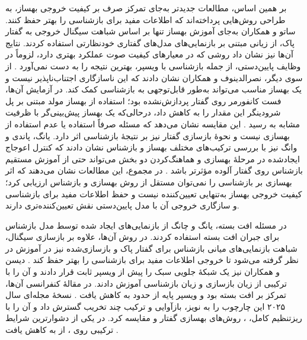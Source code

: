 بر همین اساس، مطالعات جدیدتر به‌جای تمرکز صرف بر کیفیت خروجی بهساز، به طراحی روش‌هایی پرداخته‌اند که اطلاعات مفید برای بازشناسی را بهتر حفظ کنند. ساتو و همکاران به‌جای آموزش بهساز تنها بر اساس شباهت سیگنال خروجی به گفتار پاک، از زیانی مبتنی بر بازنمایی‌های مدل‌های گفتاری خودنظارتی استفاده کردند. نتایج آن‌ها نیز نشان داد روشی که در معیارهای کیفیت صوت عملکرد بهتری دارد، لزوماً در وظایف پایین‌دستی، از جمله بازشناسی با ویسپر، بهترین نتیجه را به دست نمی‌آورد . از سوی دیگر، نصرالدینوف و همکاران نشان دادند که این ناسازگاری اجتناب‌ناپذیر نیست و یک بهساز مناسب می‌تواند به‌طور قابل‌توجهی به بازشناسی کمک کند. در آزمایش آن‌ها،  فست کانفورمر روی گفتار پردازش‌نشده  بود؛ استفاده از بهساز مولد مبتنی بر پل شرودینگر این مقدار را به  کاهش داد، درحالی‌که یک بهساز پیش‌بینی‌گر با ظرفیت مشابه به  رسید . این مقایسه نشان می‌دهد که مسئله صرفاً استفاده یا عدم استفاده از بهسازی نیست و نحوهٔ بازسازی گفتار نیز بر نتیجهٔ بازشناسی اثر دارد. یانگ، پاندی و وانگ نیز با بررسی ترکیب‌های مختلف بهساز و بازشناس نشان دادند که کنترل اعوجاج ایجادشده در مرحلهٔ بهسازی و هماهنگ‌کردن دو بخش می‌تواند حتی از آموزش مستقیم بازشناس روی گفتار آلوده مؤثرتر باشد . در مجموع، این مطالعات نشان می‌دهند که اثر بهسازی بر بازشناسی را نمی‌توان مستقل از روش بهسازی و بازشناس ارزیابی کرد؛ کیفیت خروجی بهساز به‌تنهایی تعیین‌کننده نیست و حفظ اطلاعات مفید برای بازشناسی و سازگاری خروجی آن با مدل پایین‌دستی نقش تعیین‌کننده‌تری دارند.


در مسئله افت بسته، یانگ و چانگ از بازنمایی‌های ایجاد شده توسط مدل بازشناس برای جبران افت بسته استفاده کردند. در روش آن‌ها، علاوه بر بازسازی سیگنال، شباهت بازنمایی‌های میانی بازشناس برای گفتار پاک و بازسازی‌شده نیز در آموزش در نظر گرفته می‌شود تا خروجی  اطلاعات مفید برای بازشناسی را بهتر حفظ کند . دیسن و همکاران نیز یک شبکهٔ جلویی سبک را پیش از ویسپر ثابت قرار دادند و آن را با ترکیبی از زیان بازسازی و زیان بازشناسی آموزش دادند. در مقالهٔ کنفرانسی آن‌ها، تمرکز بر افت بسته بود و  ویسپر پایه از حدود  به  کاهش یافت . نسخهٔ مجله‌ای سال ۲۰۲۵ این چارچوب را به نویز، بازآوایی و ترکیب چند تخریب گسترش داد و آن را با ریزتنظیم کامل، ، روش‌های بهسازی گفتار و  مقایسه کرد. در یکی از دشوارترین شرایط ترکیبی روی ،  از  به  کاهش یافت .

